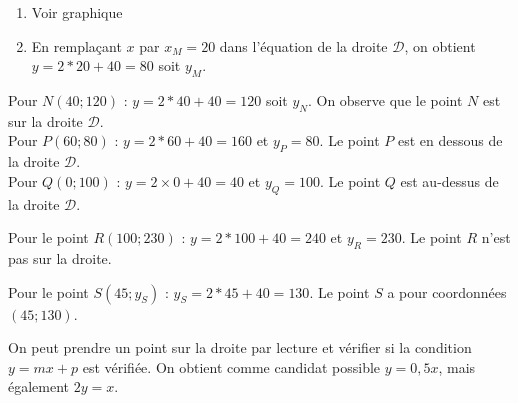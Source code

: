 \begin{MADenumerate}
			\item \begin{enumerate}
				\item Voir graphique
				\item En remplaçant $x$ par $x_M=20$ dans l'équation de la droite $\mathcal{D}$, on obtient $y=2*20+40=80$ soit $y_M$.
			\end{enumerate}
			\item Pour $N(40;120)$ : $y=2*40+40=120$ soit $y_N$. On observe que le point $N$ est sur la droite $\mathcal{D}$.\\
			Pour $P(60;80)$ : $y=2*60+40=160$ et $y_P=80$. Le point $P$ est en dessous de la droite $\mathcal{D}$.\\
			Pour $Q(0;100)$ : $y=2\times 0+40=40$ et $y_Q=100$. Le point $Q$ est au-dessus de la droite $\mathcal{D}$.
			\item Pour le point $R(100;230)$ : $y=2*100+40=240$ et $y_R=230$. Le point $R$ n'est pas sur la droite.
			\item Pour le point $S(45;y_S)$ : $y_S=2*45+40=130$. Le point $S$ a pour coordonnées $(45;130)$.
			\item On peut prendre un point sur la droite par lecture et vérifier si la condition $y=mx+p$ est vérifiée.
			On obtient comme candidat possible $y=0,5x$, mais également $2y=x$.
		\end{MADenumerate}
